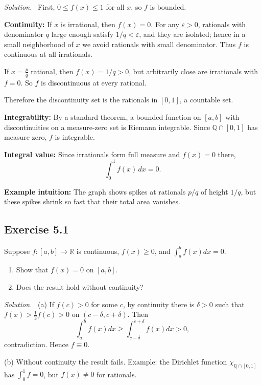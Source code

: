 \documentclass[11pt,a4paper]{article}
\newenvironment{solution}{\par\noindent\textit{Solution.}\ }{\par\vspace{0.5em}}
\begin{document}
\begin{solution}
	First, $0\leq f(x)\leq 1$ for all $x$, so $f$ is bounded.
	
	\textbf{Continuity:} 
	If $x$ is irrational, then $f(x)=0$. For any $\varepsilon>0$, rationals with denominator $q$ large enough satisfy $1/q<\varepsilon$, and they are isolated; hence in a small neighborhood of $x$ we avoid rationals with small denominator. Thus $f$ is continuous at all irrationals.
	
	If $x=\tfrac{p}{q}$ rational, then $f(x)=1/q>0$, but arbitrarily close are irrationals with $f=0$. So $f$ is discontinuous at every rational.
	
	Therefore the discontinuity set is the rationals in $[0,1]$, a countable set.
	
	\textbf{Integrability:} 
	By a standard theorem, a bounded function on $[a,b]$ with discontinuities on a measure-zero set is Riemann integrable. Since $\mathbb{Q}\cap[0,1]$ has measure zero, $f$ is integrable.
	
	\textbf{Integral value:} Since irrationals form full measure and $f(x)=0$ there,
	\[
	\int_0^1 f(x)\,dx = 0.
	\]
	
	\textbf{Example intuition:} The graph shows spikes at rationals $p/q$ of height $1/q$, but these spikes shrink so fast that their total area vanishes.
\end{solution}

\subsection*{Exercise 5.1}
Suppose $f:[a,b]\to\mathbb{R}$ is continuous, $f(x)\geq 0$, and $\int_a^b f(x)dx=0$.
\begin{enumerate}[label=\alph*)]
	\item Show that $f(x)=0$ on $[a,b]$.
	\item Does the result hold without continuity?
\end{enumerate}

\begin{solution}
	(a) If $f(c)>0$ for some $c$, by continuity there is $\delta>0$ such that $f(x)>\tfrac12 f(c)>0$ on $(c-\delta,c+\delta)$. Then
	\[
	\int_a^b f(x)dx\geq \int_{c-\delta}^{c+\delta} f(x)dx > 0,
	\]
	contradiction. Hence $f\equiv 0$.
	
	(b) Without continuity the result fails. Example: the Dirichlet function $\chi_{\mathbb{Q}\cap[0,1]}$ has $\int_0^1 f=0$, but $f(x)\neq 0$ for rationals.
\end{solution}
\end{document}
